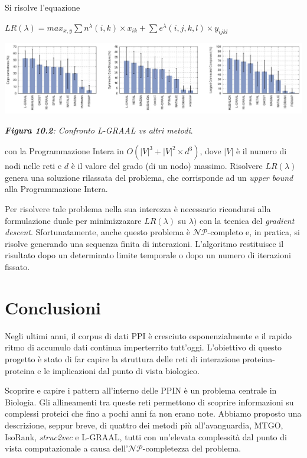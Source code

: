 \documentclass[11pt]{article}
\begin{document}
Si risolve l'equazione
\begin{center}
$LR(\lambda) = max_{x,y} \displaystyle{\sum n^{\lambda}(i,k) \times x_{ik} + \sum e^{\lambda}(i,j,k,l) \times y_{ijkl}}$
\end{center}

\begin{center}
\includegraphics[scale=0.33]{graal2}

\begin{small}\textit{\textbf{Figura 10.2}: Confronto L-GRAAL vs altri metodi}.\end{small}
\end{center}

con la Programmazione Intera in $O(|V|^3 + |V|^2 \times d^3)$, dove $|V|$ è il numero di nodi nelle reti e $d$ è il valore del grado (di un nodo) massimo. Risolvere $LR(\lambda)$ genera una soluzione rilassata del problema, che corrisponde ad un \textit{upper bound} alla Programmazione Intera. 

Per risolvere tale problema nella sua interezza è necessario ricondursi alla formulazione duale per minimizzazare $LR(\lambda)$ su $\lambda)$ con la tecnica del \textit{gradient descent}. Sfortunatamente, anche questo problema è $\mathcal{NP}$-completo e, in pratica, si risolve generando una sequenza finita di interazioni. L'algoritmo restituisce il risultato dopo un determinato limite temporale o dopo un numero di iterazioni fissato.

\pagebreak
\section{Conclusioni}
Negli ultimi anni, il corpus di dati PPI è cresciuto esponenzialmente e il rapido ritmo di accumulo dati continua imperterrito tutt'oggi. L'obiettivo di questo progetto è stato di far capire la struttura delle reti di interazione proteina-proteina e le implicazioni dal punto di vista biologico.

Scoprire e capire i pattern all'interno delle PPIN è un problema centrale in Biologia. Gli allineamenti tra queste reti permettono di scoprire informazioni su complessi proteici che fino a pochi anni fa non erano note. Abbiamo proposto una descrizione, seppur breve, di quattro dei metodi più all'avanguardia, MTGO, IsoRank, \textit{struc2vec} e L-GRAAL, tutti con un'elevata complessità dal punto di vista computazionale a causa dell'$\mathcal{NP}$-completezza del problema.
\end{document}
